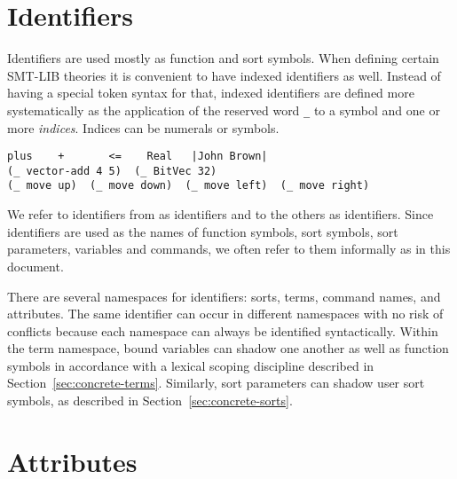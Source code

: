 \section{Identifiers} \label{sec:identifiers}

Identifiers are used mostly as function and sort symbols.
When defining certain SMT-LIB theories 
it is convenient to have indexed identifiers as well.
Instead of having a special token syntax for that,
indexed identifiers are defined more systematically 
as the application of the reserved word \verb+_+
to a symbol and one or more \emph{indices}.
Indices can be numerals or symbols.
\bigskip

\cIdentifiers
\bigskip

\begin{lstlisting}[linewidth=38em]
plus    +       <=    Real   |John Brown|
(_ vector-add 4 5)  (_ BitVec 32)
(_ move up)  (_ move down)  (_ move left)  (_ move right)
\end{lstlisting}

We refer to identifiers from  as  identifiers
and to the others as  identifiers.
Since identifiers are used as the names of function symbols, sort symbols,
sort parameters, variables and commands, we often refer to them informally 
as  in this document.
  
\begin{remark}
There are several namespaces for identifiers:
sorts, terms, command names, and attributes. 
The same identifier can occur in different namespaces with no risk of conflicts
because each namespace can always be identified syntactically.
Within the term namespace, bound variables can shadow one another as well as
function symbols in accordance with a lexical scoping discipline described 
in Section~\ref{sec:concrete-terms}. 
Similarly, sort parameters can shadow user sort symbols,
as described in Section~\ref{sec:concrete-sorts}.
\end{remark}


\section{Attributes}

